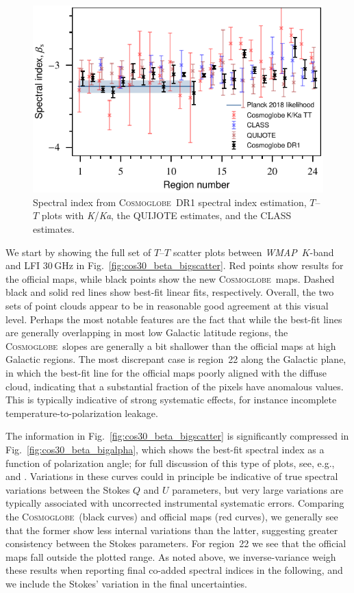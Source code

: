 \documentclass[twocolumn]{../../common/aa}
\def\WMAP{\emph{WMAP}}
\newcommand{\cosmoglobe}{\textsc{Cosmoglobe}}
\newcommand{\K}[0]{\textit K}
\newcommand{\Ka}[0]{\textit{Ka}}
\begin{document}
\begin{figure}
	\centering
	\includegraphics[width=\columnwidth]{figures/compare_betas.pdf}
	\caption{Spectral index from \cosmoglobe\ DR1 spectral index estimation, $T$--$T$ plots with \K/\Ka, the QUIJOTE estimates, and the CLASS estimates.
	}
	\label{fig:beta_comp}
\end{figure}

We start by showing the full set of $T$--$T$ scatter plots between \WMAP\ $K$-band and LFI 30\,GHz in Fig.~\ref{fig:cos30_beta_bigscatter}. Red points show results for the official maps, while black points show the new \cosmoglobe\ maps. Dashed black and solid red lines show best-fit linear fits, respectively. Overall, the two sets of point clouds appear to be in reasonable good agreement at this visual level. Perhaps the most notable features are the fact that while the best-fit lines are generally overlapping in most low Galactic latitude regions, the \cosmoglobe\ slopes are generally a bit shallower than the official maps at high Galactic regions. The most discrepant case is region~22 along the Galactic plane, in which the best-fit line for the official maps poorly aligned with the diffuse cloud, indicating that a substantial fraction of the pixels have anomalous values. This is typically indicative of strong systematic effects, for instance incomplete temperature-to-polarization leakage.

The information in Fig.~\ref{fig:cos30_beta_bigscatter} is significantly compressed in Fig.~\ref{fig:cos30_beta_bigalpha}, which shows the best-fit spectral index as a function of polarization angle; for full discussion of this type of plots, see, e.g., \citet{wehus:2013} and \citet{fuskeland:2019}. Variations in these curves could in principle be indicative of true spectral variations between the Stokes $Q$ and $U$ parameters, but very large variations are typically associated with uncorrected instrumental systematic errors. Comparing the \cosmoglobe\ (black curves) and official maps (red curves), we generally see that the former show less internal variations than the latter, suggesting greater consistency between the Stokes parameters. For region~22 we see that the official maps fall outside the plotted range. As noted above, we inverse-variance weigh these results when reporting final co-added spectral indices in the following, and we include the Stokes' variation in the final uncertainties.
\end{document}
